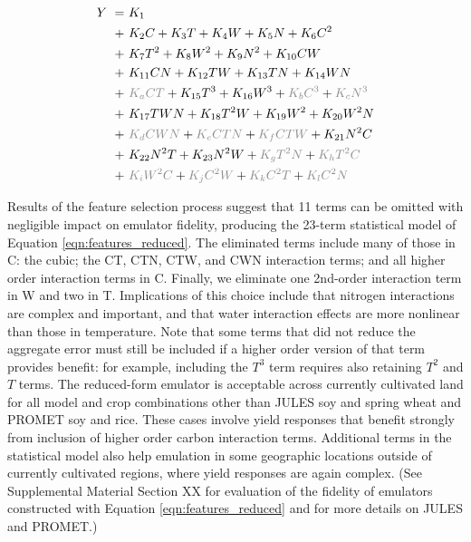 \documentclass[gmd, manuscript]{copernicus} %
\begin{document}
\vspace{-0.2in}
\begin{align}
    \label{eqn:features_reduced}
    Y\ = \ & K_{1}  \\
    + \ & K_{2} C     + K_{3} T      + K_{4} W      + K_{5} N  + K_{6} C^2 \nonumber \\
    + \ & K_{7} T^2    + K_{8} W^2    + K_{9} N^2 + K_{10} C W \nonumber \\
    + \ & K_{11} C N   + K_{12} T W   + K_{13} T N + K_{14} W N \nonumber \\
    + \ & {\color{dark-gray}K_{a} C T} + K_{15} T^3  + K_{16} W^3  + {\color{dark-gray}K_{b} C^3} + {\color{dark-gray}K_{c} N^3}\nonumber \\
    + \ & K_{17} T W N + K_{18} T^2 W + K_{19} W^2 + K_{20} W^2 N  \nonumber \\
    + \ & {\color{dark-gray}K_{d} C W N} + {\color{dark-gray}K_{e} C T N} + {\color{dark-gray}K_{f} C T W} + K_{21} N^2 C \nonumber \\
    + \ & K_{22} N^2 T + K_{23} N^2 W + {\color{dark-gray}K_{g} T^2 N} + {\color{dark-gray}K_{h} T^2 C}  \nonumber \\
    + \ & {\color{dark-gray}K_{i} W^2 C} + {\color{dark-gray}K_{j} C^2 W} + {\color{dark-gray}K_{k} C^2 T} + {\color{dark-gray}K_{l} C^2 N} \nonumber
\end{align}

Results of the feature selection process suggest that 11 terms can be omitted with negligible impact on emulator fidelity, producing the 23-term statistical model of Equation \ref{eqn:features_reduced}.
The eliminated terms include many of those in C: the cubic; the CT, CTN, CTW, and CWN interaction terms; and all higher order interaction terms in C. 
Finally, we eliminate one 2nd-order interaction term in W and two in T. 
Implications of this choice include that nitrogen interactions are complex and important, and that water interaction effects are more nonlinear than those in temperature.  
Note that some terms that did not reduce the aggregate error must still be included if a higher order version of that term provides benefit: for example, including the $T^3$ term requires also retaining $T^2$ and $T$ terms. 
The reduced-form emulator is acceptable across currently cultivated land for all model and crop combinations other than JULES soy and spring wheat and PROMET soy and rice.
These cases involve yield responses that benefit strongly from inclusion of higher order carbon interaction terms. 
Additional terms in the statistical model also help emulation in some geographic locations outside of currently cultivated regions, where yield responses are again complex. 
(See Supplemental Material Section XX for evaluation of the fidelity of emulators constructed with Equation \ref{eqn:features_reduced} and for more details on JULES and PROMET.)
\end{document}
